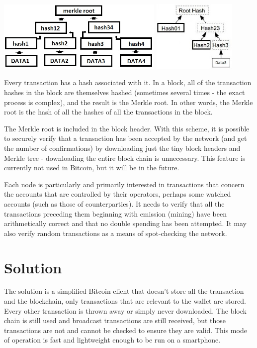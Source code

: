 \documentclass[a4paper,12pt]{article}
\begin{document}
\begin{center}
\includegraphics[width=8cm]{mroot.jpg}
\includegraphics[width=4cm]{branch.jpg}
\end{center}

Every transaction has a hash associated with it. In a block, all of the transaction hashes in the block are themselves hashed (sometimes several times - the exact process is complex), and the result is the Merkle root. In other words, the Merkle root is the hash of all the hashes of all the transactions in the block. 

The Merkle root is included in the block header. With this scheme, it is possible to securely verify that a transaction has been accepted by the network (and get the number of confirmations) by downloading just the tiny block headers and Merkle tree - downloading the entire block chain is unnecessary. This feature is currently not used in Bitcoin, but it will be in the future.

Each node is particularly and primarily interested in transactions that concern the accounts that are controlled by their operators, perhaps some watched accounts (such as those of counterparties). It needs to verify that all the transactions preceding them beginning with emission (mining) have been arithmetically correct and that no double spending has been attempted. It may also verify random transactions as a means of
spot-checking the network.

\section{Solution}
The solution is a simplified Bitcoin client that doesn't store all the transaction and the blockchain, only transactions that are relevant to the wallet are stored. Every other transaction is thrown away or simply never downloaded. The block chain is still used and broadcast transactions are still received, but those transactions are not and cannot be checked to ensure they are valid. This mode of operation is fast and lightweight enough to be run on a smartphone.
\end{document}
